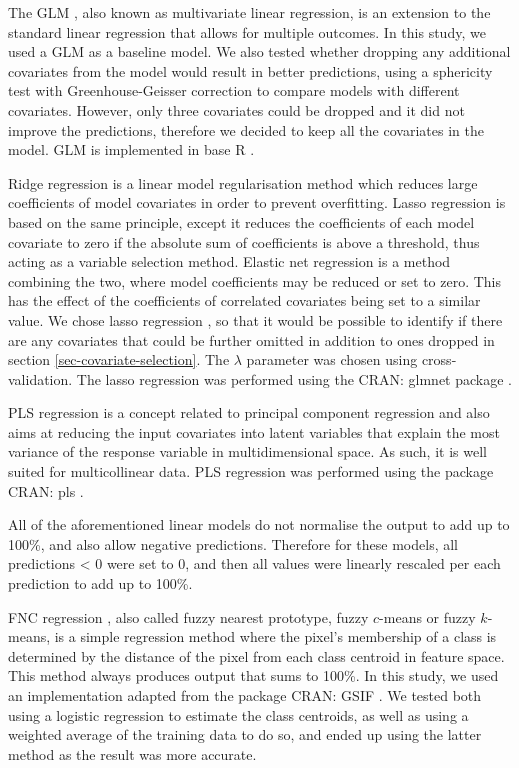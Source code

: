 \documentclass[review,authoryear,3p]{elsarticle}
\newcommand{\cran}[1]{CRAN: #1}
\begin{document}
The \gls{GLM} \citep{neter_applied_1996}, also known as multivariate linear regression, is an extension to the standard linear regression that allows for multiple outcomes.
In this study, we used a \gls{GLM} as a baseline model.
We also tested whether dropping any additional covariates from the model would result in better predictions, using a sphericity test with Greenhouse-Geisser correction \citep{greenhouse_methods_1959} to compare models with different covariates.
However, only three covariates could be dropped and it did not improve the predictions, therefore we decided to keep all the covariates in the model.
\Gls{GLM} is implemented in base R \citep{r_2019}.

Ridge regression is a linear model regularisation method which reduces large coefficients of model covariates in order to prevent overfitting.
Lasso regression is based on the same principle, except it reduces the coefficients of each model covariate to zero if the absolute sum of coefficients is above a threshold, thus acting as a variable selection method.
Elastic net regression is a method combining the two, where model coefficients may be reduced or set to zero.
This has the effect of the coefficients of correlated covariates being set to a similar value.
We chose lasso regression \citep{tibshirani_regression_1996}, so that it would be possible to identify if there are any covariates that could be further omitted in addition to ones dropped in section \ref{sec-covariate-selection}.
The $\lambda$ parameter was chosen using cross-validation.
The lasso regression was performed using the \cran{glmnet} package \citep{glmnet}.

\Gls{PLS} regression \citep{wold_pls-regression_2001} is a concept related to principal component regression and also aims at reducing the input covariates into latent variables that explain the most variance of the response variable in multidimensional space.
As such, it is well suited for multicollinear data.
\ac{PLS} regression was performed using the package \cran{pls} \citep{pls}.

All of the aforementioned linear models do not normalise the output to add up to 100\%, and also allow negative predictions.
Therefore for these models, all predictions < 0 were set to 0, and then all values were linearly rescaled per each prediction to add up to 100\%.

\Gls{FNC} regression \citep{keller_fuzzy_1985}, also called fuzzy nearest prototype, fuzzy $c$-means or fuzzy $k$-means, is a simple regression method where the pixel's membership of a class is determined by the distance of the pixel from each class centroid in feature space.
This method always produces output that sums to 100\%.
In this study, we used an implementation adapted from the package \cran{GSIF} \citep{hengl2004fuzzycmeans}.
We tested both using a logistic regression to estimate the class centroids, as well as using a weighted average of the training data to do so, and ended up using the latter method as the result was more accurate.
\end{document}
